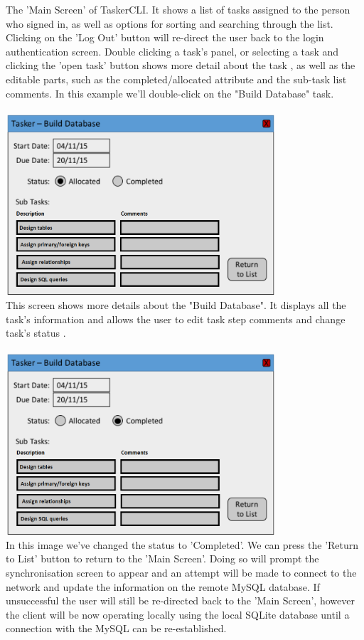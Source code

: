 \documentclass{project}
\begin{document}
The 'Main Screen' of TaskerCLI. It shows a list of tasks assigned to the person who signed in, as well as options for sorting and searching through the list. Clicking on the 'Log Out' button will re-direct the user back to the login authentication screen. Double clicking a task's panel, or selecting a task and clicking the 'open task' button shows more detail about the task \cite{se.qa.rs}, as well as the editable parts, such as the completed/allocated attribute and the sub-task list comments. In this example we'll double-click on the "Build Database" task. \\~\\
\newline
\includegraphics[width=0.75\textwidth, center]{images/5.2/TaskerCLITaskInfo} \\
This screen shows more details about the "Build Database". It displays all the task's information and allows the user to edit task step comments and change task's status \cite{se.qa.rs}. \\~\\
\newline
\includegraphics[width=0.75\textwidth, center]{images/5.2/TaskerCLITaskUpdated} \\
In this image we've changed the status to 'Completed'. We can press the 'Return to List' button to return to the 'Main Screen'. Doing so will prompt the synchronisation screen to appear and an attempt will be made to connect to the network and update the information on the remote MySQL database. If unsuccessful the user will still be re-directed back to the 'Main Screen', however the client will be now operating locally using the local SQLite database until a connection with the MySQL can be re-established.\\~\\
\end{document}
